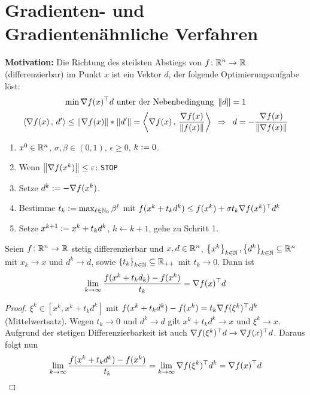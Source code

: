 \chapter{Gradienten- und Gradientenähnliche Verfahren}


\textbf{Motivation:} Die Richtung des steilsten Abstiegs von $\abb{f}{\Rn}{\R}$ (differenzierbar) im Punkt $x$ ist ein Vektor $d$, der folgende Optimierungsaufgabe löst:
\begin{equation*}
	\min \nabla \trans{f(x)} d \text{ unter der Nebenbedingung } \norm{d} = 1
\end{equation*}
\begin{equation*}
	\scal{\nabla f(x)}{d'} \le \norm{\nabla f(x)} * \norm{d'} = \scal{\nabla f(x)}{\frac{\nabla f(x)}{\norm{f(x)}}} \follows d = - \frac{\nabla f(x)}{\norm{\nabla f(x)}}
\end{equation*}

\begin{algorithmus} \label{algorithmus 8.1}
	\begin{enumerate}[label = Schritt \arabic*:, start=0, leftmargin = 5em, nolistsep]
		\item $x^0 \in \Rn$, $\sigma, \beta \in (0,1)$, $\epsilon \ge 0$, $k \defeq 0$.
		\item Wenn $\norm{\nabla f(x^k)} \le \epsilon$: \texttt{STOP}
		\item Setze $d^k \defeq - \nabla f(x^k)$.
		\item Bestimme $t_k \defeq \max_{\ell \in \N_0} \beta^\ell$ mit $f(x^k + t_k d^k) \le f(x^k) + \sigma t_k \nabla \trans{f(x^k)} d^k$
		\item Setze $x^{k+1} \defeq x^k + t_k d^k$, $k \leftarrow k + 1$, gehe zu Schritt 1.
	\end{enumerate}
\end{algorithmus}

\begin{lemma} \label{lemma 8.2}
	Seien $\abb{f}{\R^n}{\R}$ stetig differenzierbar und $x,d \in \Rn$, $\folge[k \in \N]{x^k}, \folge[k \in \N]{d^k} \subseteq \Rn$ mit $x_k \to x$ und $d^k \to d$, sowie $\folge[k \in \N]{t_k} \subseteq \R_{++}$ mit $t_k \to 0$. Dann ist 
	\begin{equation*}
		\lim_{k \to \infty} \frac{f(x^k + t_k d_k) - f(x^k)}{t_k} = \nabla \trans{f(x)} d
	\end{equation*}
\end{lemma}
\begin{proof}
	$\xi^k \in [x^k , x^k + t_k d^k]$ mit $f(x^k + t_k d^k) - f(x^k) = t_k \nabla \trans{f(\xi^k)} d^k$ (Mittelwertsatz). Wegen $t_k \to 0$ und $d^k \to d$ gilt $x^k + t_k d^k \to x$ und $\xi^k \to x$. Aufgrund der stetigen Differenzierbarkeit ist auch $\nabla \trans{f(\xi^k)} d \to \nabla \trans{f(x)} d$. Daraus folgt nun 
	\begin{equation*}
		\lim_{k \to \infty} \frac{f(x^k + t_k d^k) - f(x^k)}{t_k} = \lim_{k \to \infty} \nabla \trans{f(\xi^k)} d^k = \nabla \trans{f(x)} d
	\end{equation*}
\end{proof}

